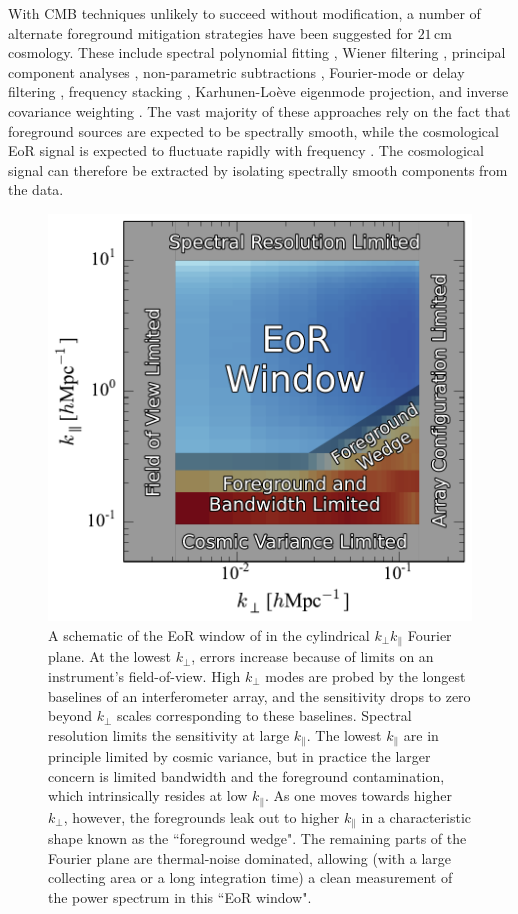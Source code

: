\documentclass[twocolumn,aps,prd,nofootinbib,showpacs]{revtex4-1}
\begin{document}
With CMB techniques unlikely to succeed without modification, a number of alternate foreground mitigation strategies have been suggested for $21\,\textrm{cm}$ cosmology.  These include spectral polynomial fitting \cite{Wang2006,Liu2009a,Bowman2009,Liu2009b}, Wiener filtering \cite{Gleser2008}, principal component analyses \cite{Paciga2011,Liu2012,Masui2013,Paciga2013}, non-parametric subtractions \cite{Harker2009,Chapman2012,Chapman2013}, Fourier-mode or delay filtering \cite{Petrovic2011, Parsons2012b}, frequency stacking \cite{Cho2012}, Karhunen-Lo\`{e}ve eigenmode projection, and inverse covariance weighting \cite{Liu2011,Dillon2013,Dillon2014}.  The vast majority of these approaches rely on the fact that foreground sources are expected to be spectrally smooth, while the cosmological EoR signal is expected to fluctuate rapidly with frequency \cite{Oh2003}.  The cosmological signal can therefore be extracted by isolating spectrally smooth components from the data.

\begin{figure}[t] 
	\centering 
	\includegraphics[width=.45\textwidth]{figures/EoRwindowCartoon.pdf}
	\caption{A schematic of the EoR window of in the cylindrical $k_\perp k_\parallel$ Fourier plane.  At the lowest $k_\perp$, errors increase because of limits on an instrument's field-of-view.  High $k_\perp$ modes are probed by the longest baselines of an interferometer array, and the sensitivity drops to zero beyond $k_\perp$ scales corresponding to these baselines.  Spectral resolution limits the sensitivity at large $k_\parallel$.  The lowest $k_\parallel$ are in principle limited by cosmic variance, but in practice the larger concern is limited bandwidth and the foreground contamination, which intrinsically resides at low $k_\parallel$.  As one moves towards higher $k_\perp$, however, the foregrounds leak out to higher $k_\parallel$ in a characteristic shape known as the ``foreground wedge".  The remaining parts of the Fourier plane are thermal-noise dominated, allowing (with a large collecting area or a long integration time) a clean measurement of the power spectrum in this ``EoR window".}
	\label{fig:SchematicWedge}
\end{figure} 
\end{document}
